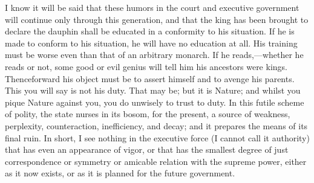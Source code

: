 I know it will be said that these humors in the court and executive government will continue only through this generation, and that the king has been brought to declare the dauphin shall be educated in a conformity to his situation. If he is made to conform to his situation, he will have no education at all. His training must be worse even than that of an arbitrary monarch. If he reads,—whether he reads or not, some good or evil genius will tell him his ancestors were kings. Thenceforward his object must be to assert himself and to avenge his parents. This you will say is not his duty. That may be; but it is Nature; and whilst you pique Nature against you, you do unwisely to trust to duty. In this futile scheme of polity, the state nurses in its bosom, for the present, a source of weakness, perplexity, counteraction, inefficiency, and decay; and it prepares the means of its final ruin. In short, I see nothing in the executive force (I cannot call it authority) that has even an appearance of vigor, or that has the smallest degree of just correspondence or symmetry or amicable relation with the supreme power, either as it now exists, or as it is planned for the future government.

